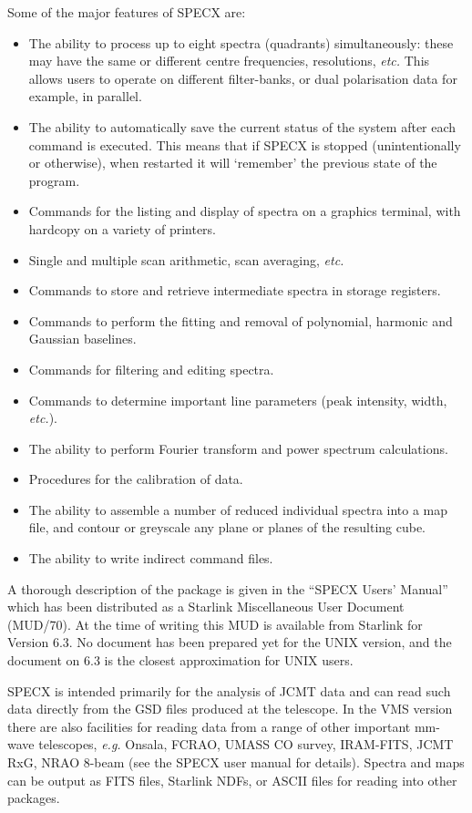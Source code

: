 \documentclass[twoside,11pt]{article}
\newcommand{\xref}[3]{#1}
\renewcommand{\_}{\texttt{\symbol{95}}}
\begin{document}
Some of the major features of SPECX are:
\begin{itemize}
\item
The ability to process up to eight spectra (quadrants) simultaneously:
these may have the same or different centre frequencies, resolutions,
\emph{etc.} This allows users to operate on different filter-banks, or
dual polarisation data for example, in parallel.
\item
The ability to automatically save the current status of the system
after each command is executed. This means that if SPECX is
stopped (unintentionally or otherwise), when restarted it will
`remember' the previous state of the program.
\item
Commands for the listing and display of spectra on a graphics
terminal, with hardcopy on a variety of printers.
\item
Single and multiple scan arithmetic, scan averaging, \emph{etc.}
\item
Commands to store and retrieve intermediate spectra in storage registers.
\item
Commands to perform the fitting and removal of polynomial,
harmonic and Gaussian baselines.
\item
Commands for filtering and editing spectra.
\item
Commands to determine important line parameters (peak intensity, width,
\emph{etc.}).
\item
The ability to perform Fourier transform and power spectrum calculations.
\item
Procedures for the calibration of data.
\item
The ability to assemble a number of reduced individual spectra into a
map file, and contour or greyscale any plane or planes of the resulting cube.
\item
The ability to write indirect command files.
\end{itemize}

A thorough description of the package is given in the ``SPECX Users' Manual''
which has been distributed as a Starlink Miscellaneous User Document
(MUD/70). At the time of writing this MUD is available from Starlink for
Version 6.3. No document has been prepared yet for the UNIX
version, and the document on 6.3 is the closest approximation for UNIX
users.

SPECX is intended primarily for the analysis of JCMT data and can read such
data directly from the \xref{GSD}{sun229}{} files produced at the telescope.  In the VMS
version there are also facilities for reading data from a range of other
important mm-wave telescopes, {\em e.g.} Onsala, FCRAO, UMASS CO survey,
IRAM-FITS, JCMT RxG, NRAO 8-beam (see the SPECX user manual for details).
Spectra and maps can be output as FITS files, Starlink NDFs, or ASCII files
for reading into other packages.
\end{document}
